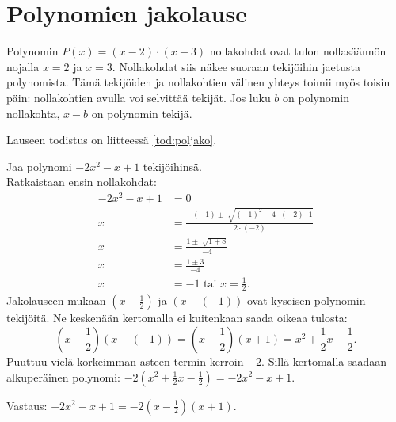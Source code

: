 \chapter{Polynomien jakolause}

Polynomin $P(x)=(x-2)\cdot(x-3)$ nollakohdat ovat tulon nollasäännön nojalla $x=2$ ja $x=3$. Nollakohdat siis näkee suoraan tekijöihin jaetusta polynomista. Tämä tekijöiden ja nollakohtien välinen yhteys toimii myös toisin päin: nollakohtien avulla voi selvittää tekijät. Jos luku $b$ on polynomin nollakohta, $x-b$ on polynomin tekijä.



Lauseen todistus on liitteessä \ref{tod:poljako}.

\begin{esimerkki}
Jaa polynomi $-2x^2-x+1$ tekijöihinsä.\\
Ratkaistaan ensin nollakohdat:
\begin{align*}
-2x^2-x+1&=0 \\
x&=\frac{-(-1) \pm \sqrt[]{(-1)^2-4 \cdot (-2) \cdot 1}}{2 \cdot (-2)} \\
x&=\frac{1 \pm \sqrt[]{1+8}}{-4} \\
x&=\frac{1 \pm 3}{-4} \\
x&=-1 \textrm{ tai } x = \frac{1}{2}.
\end{align*}
Jakolauseen mukaan $(x-\frac{1}{2})$ ja $(x-(-1))$ ovat kyseisen polynomin tekijöitä.
Ne keskenään kertomalla ei kuitenkaan saada oikeaa tulosta:
$$\left(x-\frac{1}{2}\right)(x-(-1))=\left(x-\frac{1}{2}\right)(x+1)=x^2+\frac{1}{2}x-\frac{1}{2}.$$
Puuttuu vielä korkeimman asteen termin kerroin $-2$. Sillä kertomalla saadaan alkuperäinen polynomi:
$-2(x^2+\frac{1}{2}x-\frac{1}{2})=-2x^2-x+1$.

Vastaus: $-2x^2-x+1 = -2(x-\frac{1}{2})(x+1)$.
\end{esimerkki}

